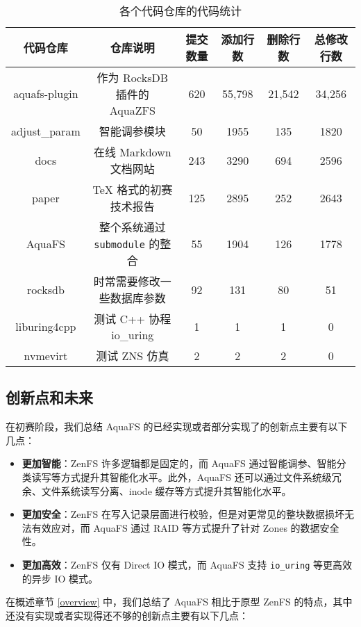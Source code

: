 \begin{table}[H]
  \centering
  \caption{各个代码仓库的代码统计}
  \label{tab:code-repo}
  \begin{tabular}{cccccc}
  \hline
  \textbf{代码仓库} & \textbf{仓库说明} & \textbf{提交数量} & \textbf{添加行数} & \textbf{删除行数} & \textbf{总修改行数} \\
  \hline
  aquafs-plugin  & 作为 RocksDB 插件的 AquaZFS & 620 & 55,798 & 21,542 & 34,256 \\ 
  adjust\_param  & 智能调参模块 & 50 & 1955 & 135 & 1820 \\ 
  docs           & 在线 Markdown 文档网站 & 243 & 3290 & 694 & 2596 \\ 
  paper          & TeX 格式的初赛技术报告 & 125 & 2895 & 252 & 2643 \\ 
  AquaFS         & 整个系统通过 \verb|submodule| 的整合 & 55 & 1904 & 126 & 1778 \\ 
  rocksdb        & 时常需要修改一些数据库参数 & 92 & 131 & 80 & 51 \\ 
  liburing4cpp   & 测试 C++ 协程 io\_uring & 1 & 1 & 1 & 0 \\ 
  nvmevirt       & 测试 ZNS 仿真 & 2 & 2 & 2 & 0 \\ 
  \end{tabular}
\end{table}

\subsection{创新点和未来}

在初赛阶段，我们总结 AquaFS 的已经实现或者部分实现了的创新点主要有以下几点：

\begin{itemize}
  \item \textbf{更加智能}：ZenFS 许多逻辑都是固定的，而 AquaFS 通过智能调参、智能分类读写等方式提升其智能化水平。此外，AquaFS 还可以通过文件系统级冗余、文件系统读写分离、inode 缓存等方式提升其智能化水平。
  \item \textbf{更加安全}：ZenFS 在写入记录层面进行校验，但是对更常见的整块数据损坏无法有效应对，而 AquaFS 通过 RAID 等方式提升了针对 Zones 的数据安全性。
  \item \textbf{更加高效}：ZenFS 仅有 Direct IO 模式，而 AquaFS 支持 \verb|io_uring| 等更高效的异步 IO 模式。
\end{itemize}

在概述章节 \ref{overview} 中，我们总结了 AquaFS 相比于原型 ZenFS 的特点，其中还没有实现或者实现得还不够的创新点主要有以下几点：

